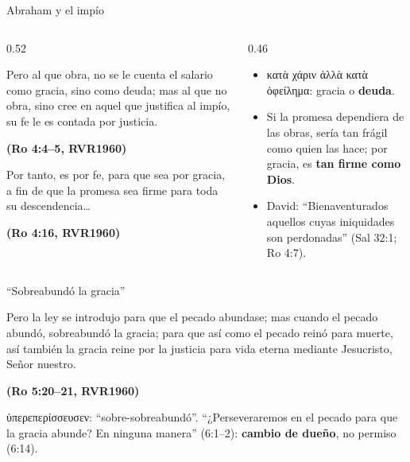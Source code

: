 \documentclass[hyperref={bookmarks=false},aspectratio=169]{beamer}
\newcommand{\grc}[1]{\foreignlanguage{ancientgreek}{#1}}
\newcommand{\fuente}[1]{\par\hfill{\upshape\bfseries\footnotesize\textcolor{azul}{#1}}}
\newcommand{\destacar}[1]{\textbf{\textcolor{azul}{#1}}}
\begin{document}
\begin{frame}{Abraham y el impío}
\begin{columns}[c,onlytextwidth]
\begin{column}{0.52\textwidth}
\begin{cita}Pero al que obra, no se le cuenta el salario como gracia, sino como deuda; mas al que no obra, sino cree en aquel que justifica al impío, su fe le es contada por justicia.\fuente{(Ro 4:4--5, RVR1960)}\end{cita}
\begin{cita}Por tanto, es por fe, para que sea por gracia, a fin de que la promesa sea firme para toda su descendencia\ldots\fuente{(Ro 4:16, RVR1960)}\end{cita}
\end{column}
\begin{column}{0.46\textwidth}\small\RaggedRight
\begin{itemize}
\item \grc{κατὰ χάριν ἀλλὰ κατὰ ὀφείλημα}: gracia o \destacar{deuda}.
\item Si la promesa dependiera de las obras, sería tan frágil como quien las hace; por gracia, es \destacar{tan firme como Dios}.
\item David: ``Bienaventurados aquellos cuyas iniquidades son perdonadas'' (Sal 32:1; Ro 4:7).
\end{itemize}
\end{column}
\end{columns}
\end{frame}

\begin{frame}{``Sobreabundó la gracia''}
\begin{cita}Pero la ley se introdujo para que el pecado abundase; mas cuando el pecado abundó, sobreabundó la gracia; para que así como el pecado reinó para muerte, así también la gracia reine por la justicia para vida eterna mediante Jesucristo, Señor nuestro.\fuente{(Ro 5:20--21, RVR1960)}\end{cita}
\centering
{}\par\smallskip
\scriptsize \grc{ὑπερεπερίσσευσεν}: ``sobre-sobreabundó''. ``¿Perseveraremos en el pecado para que la gracia abunde? En ninguna manera'' (6:1--2): \destacar{cambio de dueño}, no permiso (6:14).
\end{frame}
\end{document}
